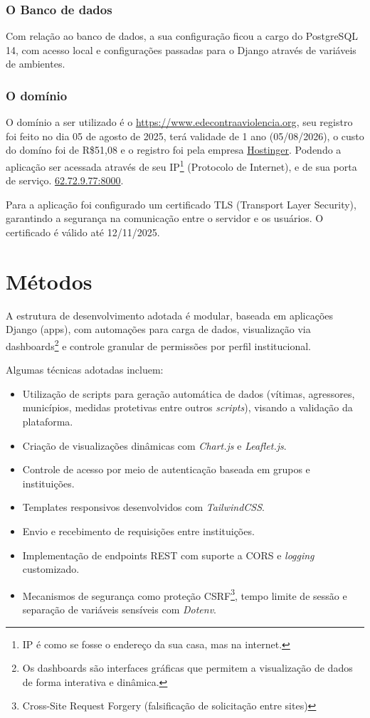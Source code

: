 \subsubsection{O Banco de dados}
\par Com relação ao banco de dados, a sua configuração ficou a cargo do PostgreSQL 14, com acesso local e configurações passadas para o Django através de variáveis de ambientes.

\subsubsection{O domínio}
\par O domínio a ser utilizado é o \href{https://www.redecontraaviolencia.org}{https://www.edecontraaviolencia.org}, seu registro foi feito no dia 05 de agosto de 2025, terá validade de 1 ano (05/08/2026), o custo do domíno foi de R\$51,08 e o registro foi pela empresa \href{https://www.hostinger.com/br}{Hostinger}. Podendo a aplicação ser acessada através de seu IP\footnote{IP é como se fosse o endereço da sua casa, mas na internet.} (Protocolo de Internet), e de sua porta de serviço. \href{62.72.9.77:8000}{62.72.9.77:8000}.
\par Para a aplicação foi configurado um certificado TLS (Transport Layer Security), garantindo a segurança na comunicação entre o servidor e os usuários. O certificado é válido até 12/11/2025.


\section{Métodos}

A estrutura de desenvolvimento adotada é modular, baseada em aplicações Django (apps), com automações para carga de dados, visualização via dashboards\footnote{Os dashboards são interfaces gráficas que permitem a visualização de dados de forma interativa e dinâmica.} e controle granular de permissões por perfil institucional.

Algumas técnicas adotadas incluem:
\begin{itemize}
\item Utilização de scripts para geração automática de dados (vítimas, agressores, municípios, medidas protetivas entre outros \textit{scripts}), visando a validação da plataforma.
\item Criação de visualizações dinâmicas com \textit{Chart.js} e \textit{Leaflet.js}.
\item Controle de acesso por meio de autenticação baseada em grupos e instituições.
\item Templates responsivos desenvolvidos com \textit{TailwindCSS}.
\item Envio e recebimento de requisições entre instituições.
\item Implementação de endpoints REST com suporte a CORS e \textit{logging} customizado.
\item Mecanismos de segurança como proteção CSRF\footnote{Cross-Site Request Forgery (falsificação de solicitação entre sites)}, tempo limite de sessão e separação de variáveis sensíveis com \textit{Dotenv}.
\end{itemize}

